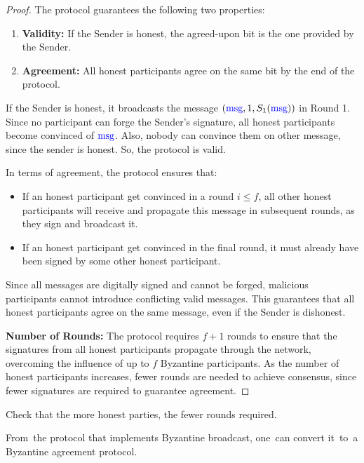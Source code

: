 \begin{proof}
    The protocol guarantees the following two properties:
    \begin{enumerate}
        \item \textbf{Validity:} If the Sender is honest, the agreed-upon bit is the one provided by the Sender.
        \item \textbf{Agreement:} All honest participants agree on the same bit by the end of the protocol.
    \end{enumerate}

    If the Sender is honest, it broadcasts the message $(\textcolor{blue}{\text{msg}}, 1, S_1(\textcolor{blue}{\text{msg}}))$ in Round 1. 
    Since no participant can forge the Sender's signature, all honest participants become convinced of $\textcolor{blue}{\text{msg}}$.
    Also, nobody can convince them on other message, since the sender is honest.
    So, the protocol is valid.

    In terms of agreement, the protocol ensures that:
    \begin{itemize}
        \item If an honest participant get convinced in a round $i \le f$, all other honest participants will receive and propagate this message in subsequent rounds, as they sign and broadcast it.
        \item If an honest participant get convinced in the final round, it must already have been signed by some other honest participant. 
    \end{itemize}
    Since all messages are digitally signed and cannot be forged, malicious participants cannot introduce conflicting valid messages. 
    This guarantees that all honest participants agree on the same message, even if the Sender is dishonest.

    \textbf{Number of Rounds:} The protocol requires $f + 1$ rounds to ensure that the signatures from all honest participants propagate through the network, overcoming the influence of up to $f$ Byzantine participants. 
    As the number of honest participants increases, fewer rounds are needed to achieve consensus, since fewer signatures are required to guarantee agreement.
\end{proof}

\begin{exercise}
    Check that the more honest parties, the fewer rounds required.
\end{exercise}

From~the protocol that implements Byzantine broadcast, one~can convert it~to~a Byzantine agreement protocol.

